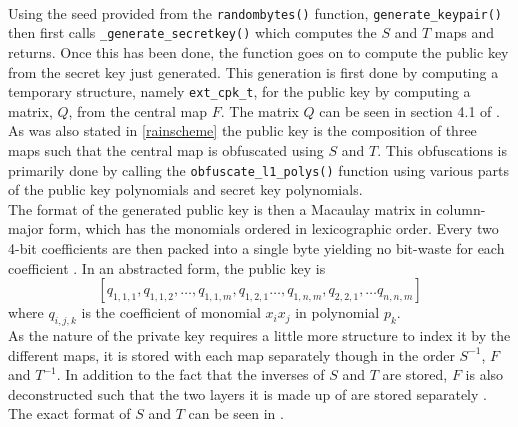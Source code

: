 \medskip\\
Using the seed provided from the \texttt{randombytes()} function, \texttt{generate\_keypair()} then first calls \texttt{\_generate\_secretkey()} which computes the $S$ and $T$ maps and returns. Once this has been done, the function goes on to compute the public key from the secret key just generated. This generation is first done by computing a temporary structure, namely \texttt{ext\_cpk\_t}, for the public key by computing a matrix, $Q$, from the central map $F$. The matrix $Q$ can be seen in section 4.1 of \cite{rainbownist}. As was also stated in \cref{rainscheme} the public key is the composition of three maps such that the central map is obfuscated using $S$ and $T$. This obfuscations is primarily done by calling the \texttt{obfuscate\_l1\_polys()} function using various parts of the public key polynomials and secret key polynomials.
\medskip\\
The format of the generated public key is then a Macaulay matrix in column-major form, which has the monomials ordered in lexicographic order. Every two 4-bit coefficients are then packed into a single byte yielding no bit-waste for each coefficient \cite{rainbownist}. In an abstracted form, the public key is
$$
    [q_{1,1,1}, q_{1,1,2}, \dots,q_{1,1,m},q_{1,2,1} \dots , q_{1,n,m}, q_{2,2,1}, \dots q_{n,n,m}]
$$
where $q_{i,j,k}$ is the coefficient of monomial $x_ix_j$ in polynomial $p_k$.\medskip\\
As the nature of the private key requires a little more structure to index it by the different maps, it is stored with each map separately though in the order $S^{-1}$, $F$ and $T^{-1}$. In addition to the fact that the inverses of $S$ and $T$ are stored, $F$ is also deconstructed such that the two layers it is made up of are stored separately \cite{rainbownist}. The exact format of $S$ and $T$ can be seen in \cite{rainbownist}.
